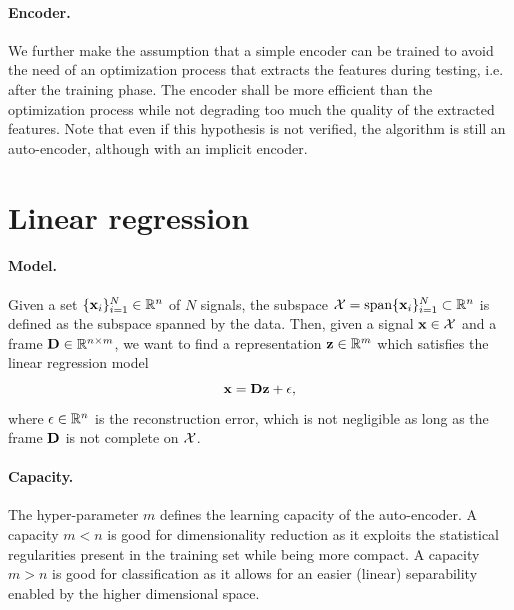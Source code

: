 \paragraph{Encoder.}
We further make the assumption that a simple encoder can be trained to avoid the need of an optimization process that extracts the features during testing, i.e. after the training phase. The encoder shall be more efficient than the optimization process while not degrading too much the quality of the extracted features. Note that even if this hypothesis is not verified, the algorithm is still an auto-encoder, although with an implicit encoder.

\section{Linear regression} \label{sec:linear_regression}

\paragraph{Model.}
Given a set $\{\mathbf{x}_i\}_{i=1}^N \in \mathbb{R}^n$ of $N$ signals, the subspace $\mathcal{X} = \operatorname*{span} \{\mathbf{x}_i\}_{i=1}^N \subset \mathbb{R}^n$ is defined as the subspace spanned by the data. Then, given a signal $\mathbf{x} \in \mathcal{X}$ and a frame $\mathbf{D} \in \mathbb{R}^{n \times m}$, we want to find a representation $\mathbf{z} \in \mathbb{R}^m$ which satisfies the linear regression model
\begin{equation} \label{eqn:linear_regression}
	\mathbf{x} = \mathbf{D} \mathbf{z} + \mathbf{\epsilon},
\end{equation}
where $\mathbf{\epsilon} \in \mathbb{R}^n$ is the reconstruction error, which is not negligible as long as the frame $\mathbf{D}$ is not complete on $\mathcal{X}$.

\paragraph{Capacity.} The hyper-parameter $m$ defines the learning capacity of the auto-encoder. A capacity $m < n$ is good for dimensionality reduction as it exploits the statistical regularities present in the training set while being more compact. A capacity $m > n$ is good for classification as it allows for an easier (linear) separability enabled by the higher dimensional space.

